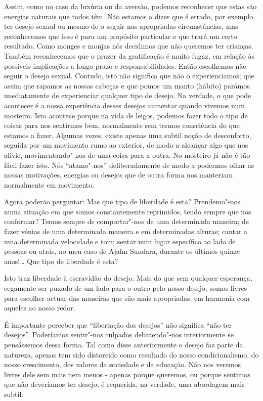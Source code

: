 Assim, como no caso da luxúria ou da aversão, podemos reconhecer que
estas são energias naturais que todos têm. Não estamos a dizer que é
errado, por exemplo, ter desejo sexual ou mesmo de o seguir nas
apropriadas circunstâncias, mas reconhecemos que isso é para um
propósito particular e que trará um certo resultado. Como monges e
monjas nós decidimos que não queremos ter crianças. Também reconhecemos
que o prazer da gratificação é muito fugaz, em relação às possíveis
implicações a longo prazo e responsabilidades. Então escolhemos não
seguir o desejo sexual. Contudo, isto não significa que não o
experienciamos; que assim que rapamos as nossas cabeças e que pomos um 
manto (hábito) parámos imediatamente de experienciar qualquer tipo
de desejo. Na verdade, o que pode acontecer é a nossa experiência desses
desejos aumentar quando vivemos num mosteiro. Isto acontece porque na
vida de leigos, podemos fazer todo o tipo de coisas para nos sentirmos
bem, normalmente sem termos consciência do que estamos a fazer. Algumas
vezes, existe apenas uma subtil noção de desconforto, seguida por um
movimento rumo ao exterior, de modo a alcançar algo que nos alivie,
movimentando"-nos de uma coisa para a outra. No mosteiro já não é tão
fácil fazer isto. Nós ``atamo"-nos'' deliberadamente de modo a podermos
olhar as nossas motivações, energias ou desejos que de outra forma nos
manteriam normalmente em movimento.

Agora poderão perguntar: Mas que tipo de liberdade é esta? Prendemo"-nos
numa situação em que somos constantemente reprimidos, tendo sempre que
nos conformar? Temos sempre de comportar"-nos de uma determinada maneira;
de fazer vénias de uma determinada maneira e em determinadas alturas;
cantar a uma determinada velocidade e tom; sentar num lugar específico
ao lado de pessoas ou atrás, no meu caso de Ajahn Sundara, durante os
últimos quinze anos!\ldots{} Que tipo de liberdade é esta?

Isto traz liberdade à escravidão do desejo. Mais do que sem qualquer
esperança, cegamente ser puxado de um lado para o outro pelo nosso
desejo, somos livres para escolher actuar das maneiras que são mais
apropriadas, em harmonia com aqueles ao nosso redor.

É importante perceber que ``libertação dos desejos'' não significa ``não
ter desejos''. Poderíamos sentir"-nos culpados debatendo"-nos
interiormente se pensássemos dessa forma. Tal como disse anteriormente o
desejo faz parte da natureza, apenas tem sido distorcido como resultado
do nosso condicionalismo, do nosso crescimento, dos valores da sociedade
e da educação. Não nos veremos livres dele sem mais nem menos - apenas
porque queremos, ou porque sentimos que não deveríamos ter desejo; é
requerida, na verdade, uma abordagem mais subtil.

